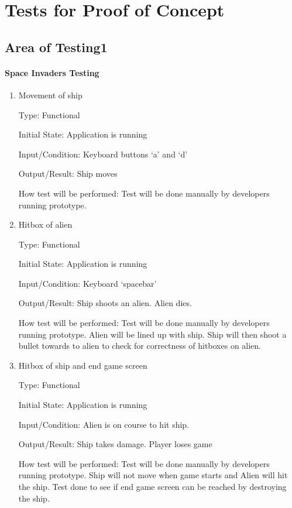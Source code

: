 \documentclass[12pt, titlepage]{article}
\begin{document}
\section{Tests for Proof of Concept}

\subsection{Area of Testing1}
		
\paragraph{Space Invaders Testing}

\begin{enumerate}

\item{Movement of ship\\}

Type: Functional

Initial State: Application is running

Input/Condition: Keyboard buttons ‘a’ and ‘d'

Output/Result: Ship moves

How test will be performed: Test will be done manually by developers running prototype. 

					
\item{Hitbox of alien\\}

Type: Functional

Initial State: Application is running

Input/Condition: Keyboard ‘spacebar’

Output/Result: Ship shoots an alien. Alien dies.

How test will be performed: Test will be done manually by developers running prototype. Alien will be lined up with ship. Ship will then shoot a bullet towards to alien to check for correctness of hitboxes on alien.



\item{Hitbox of ship and end game screen\\}

Type: Functional

Initial State: Application is running

Input/Condition: Alien is on course to hit ship.

Output/Result: Ship takes damage. Player loses game

How test will be performed: Test will be done manually by developers running prototype. Ship will not move when game starts and Alien will hit the ship. Test done to see if end game screen can be reached by destroying the ship. 

\end{enumerate}
\end{document}

